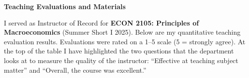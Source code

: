 \documentclass[11pt]{article}
\begin{document}
\thispagestyle{firstpage}

\vspace*{0.6in}
\begin{center}
\Huge \textbf{Teaching Evaluations and Materials}
\end{center}
\vspace*{0.35in}

\noindent I served as Instructor of Record for \textbf{ECON 2105: Principles of Macroeconomics} (Summer Short I 2025). Below are my quantitative teaching evaluation results. Evaluations were rated on a 1--5 scale (5 = strongly agree). At the top of the table I have highlighted the two questions that the department looks at to measure the quality of the instructor: ``Effective at teaching subject matter'' and ``Overall, the course was excellent.''
\end{document}
